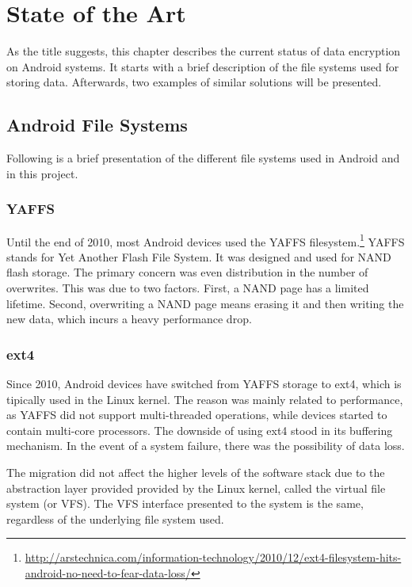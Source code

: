 \chapter{State of the Art}
\label{chapter:state}

As the title suggests, this chapter describes the current status of data encryption on Android systems. It starts with a brief description of the file systems used for storing data. Afterwards, two examples of similar solutions will be presented.

\section{Android File Systems}
\label{sec:android-filesys}

Following is a brief presentation of the different file systems used in Android and in this project.

\subsection{YAFFS}
\label{sub-sec:yaffs}

Until the end of 2010, most Android devices used the YAFFS filesystem.\footnote{\url{http://arstechnica.com/information-technology/2010/12/ext4-filesystem-hits-android-no-need-to-fear-data-loss/}}
YAFFS stands for Yet Another Flash File System. It was designed and used for NAND flash storage. The primary concern was even distribution in the number of overwrites. This was due to two factors. First, a NAND page has a limited lifetime. Second, overwriting a NAND page means erasing it and then writing the new data, which incurs a heavy performance drop.

\subsection{ext4}
\label{sub-sec:ext4}

Since 2010, Android devices have switched from YAFFS storage to ext4, which is tipically used in the Linux kernel. The reason was mainly related to performance, as YAFFS did not support multi-threaded operations, while devices started to contain multi-core processors.
The downside of using ext4 stood in its buffering mechanism. In the event of a system failure, there was the possibility of data loss.

The migration did not affect the higher levels of the software stack due to the abstraction layer provided provided by the Linux kernel, called the virtual file system (or VFS). The VFS interface presented to the system is the same, regardless of the underlying file system used.

